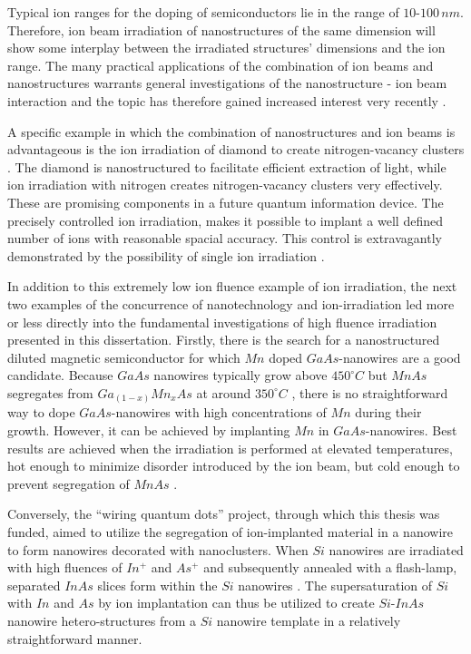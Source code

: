 Typical ion ranges for the doping of semiconductors lie in the range of $10$-$100\,nm$. Therefore, ion beam irradiation of nanostructures of the same dimension will show some interplay between the irradiated structures' dimensions and the ion range. The many practical applications of the combination of ion beams and nanostructures warrants general investigations of the nanostructure - ion beam interaction and the topic has therefore gained increased interest very recently \cite{borschel_ion-solid_2012,greaves_enhanced_2013,nietiadi_sputtering_2014,johannes_ion_2015,urbassek_sputter_2015}.  

A specific example in which the combination of nanostructures and ion beams is advantageous is the ion irradiation of diamond to create nitrogen-vacancy clusters \cite{babinec_diamond_2010}. The diamond is nanostructured to facilitate efficient extraction of light, while ion irradiation with nitrogen creates nitrogen-vacancy clusters very effectively. These are promising components in a future quantum information device. The precisely controlled ion irradiation, makes it possible to implant a well defined number of ions with reasonable spacial accuracy. This control is extravagantly demonstrated by the possibility of single ion irradiation \cite{meijer_concept_2006,ohdomari_single-ion_2008}. 

In addition to this extremely low ion fluence example of ion irradiation, the next two examples of the concurrence of nanotechnology and ion-irradiation led more or less directly into the fundamental investigations of high fluence irradiation presented in this dissertation. Firstly, there is the search for a nanostructured diluted magnetic semiconductor for which $Mn$ doped $GaAs$-nanowires are a good candidate. Because $GaAs$ nanowires typically grow above $450^\circ C$ but $MnAs$ segregates from $Ga_{(1-x)}Mn_xAs$ at around $350^\circ C$ \cite{dietl_engineering_2006,sadowski_gaasmnas_2011}, there is no straightforward way to dope $GaAs$-nanowires with high concentrations of $Mn$ during their growth. However, it can be achieved by implanting $Mn$ in $GaAs$-nanowires. Best results are achieved when the irradiation is performed at elevated temperatures, hot enough to minimize disorder introduced by the ion beam, but cold enough to prevent segregation of $MnAs$ \cite{borschel_new_2011,paschoal_hopping_2012,borschel_ion-solid_2012,kumar_magnetic_2013,paschoal_magnetoresistance_2014}. 

Conversely, the ``wiring quantum dots'' project, through which this thesis was funded, aimed to utilize the segregation of ion-implanted material in a nanowire to form nanowires decorated with nanoclusters. When $Si$ nanowires are irradiated with high fluences of $In^+$ and $As^+$ and subsequently annealed with a flash-lamp, separated $InAs$ slices form within the $Si$ nanowires \cite{prucnal_iii-v_2014,glaser_personal_2015}. The supersaturation of $Si$ with $In$ and $As$ by ion implantation can thus be utilized to create $Si$-$InAs$ nanowire hetero-structures from a $Si$ nanowire template in a relatively straightforward manner.
 
